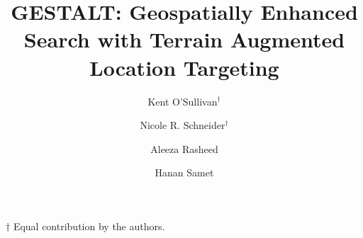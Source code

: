 \documentclass[sigconf]{style/acmart}
\begin{document}


\graphicspath{ {figures/}{auto_commit_fig/}{auto_fig/} }

\newcommand{\latexfile}[1]{}

\newcommand{\pinaforecomment}[4]{\colorbox{#1}{\textcolor{#4}{\parbox{.8\linewidth}{#2: #3}}}}
\newcommand{\osullikomment}[1]{\pinaforecomment{green}{Kent}{#1}{black}}
\newcommand{\nrscomment}[1]{\pinaforecomment{violet}{Nicole}{#1}{white}}

\newcommand\blankpage{%
    \null
    \thispagestyle{empty}%
    \addtocounter{page}{-1}%
    \newpage}



\title{GESTALT: Geospatially Enhanced Search with Terrain Augmented Location Targeting}%

\author{Kent O'Sullivan{$^\dagger$}}

\author{Nicole R. Schneider$^\dagger$}

\author{Aleeza Rasheed}

\author{Hanan Samet}



\begin{abstract}
\latexfile{00_Abstract.tex}
\end{abstract}

\maketitle
$\dagger$ Equal contribution by the authors.
\end{document}
